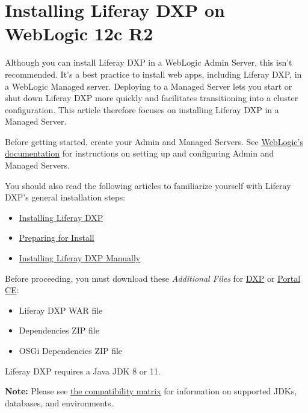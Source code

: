 \section{Installing Liferay DXP on WebLogic 12c
R2}\label{installing-liferay-dxp-on-weblogic-12c-r2}

Although you can install Liferay DXP in a WebLogic Admin Server, this
isn't recommended. It's a best practice to install web apps, including
Liferay DXP, in a WebLogic Managed server. Deploying to a Managed Server
lets you start or shut down Liferay DXP more quickly and facilitates
transitioning into a cluster configuration. This article therefore
focuses on installing Liferay DXP in a Managed Server.

Before getting started, create your Admin and Managed Servers. See
\href{http://www.oracle.com/technetwork/middleware/weblogic/documentation/index.html}{WebLogic's
documentation} for instructions on setting up and configuring Admin and
Managed Servers.

You should also read the following articles to familiarize yourself with
Liferay DXP's general installation steps:

\begin{itemize}
\tightlist
\item
  \href{/docs/7-1/deploy/-/knowledge_base/d/installing-liferay}{Installing
  Liferay DXP}
\item
  \href{/docs/7-1/deploy/-/knowledge_base/d/preparing-for-install}{Preparing
  for Install}
\item
  \href{/docs/7-1/deploy/-/knowledge_base/d/installing-liferay-manually}{Installing
  Liferay DXP Manually}
\end{itemize}

Before proceeding, you must download these \emph{Additional Files} for
\href{https://help.liferay.com/hc}{DXP} or
\href{https://www.liferay.com/downloads-community}{Portal CE}:

\begin{itemize}
\tightlist
\item
  Liferay DXP WAR file
\item
  Dependencies ZIP file
\item
  OSGi Dependencies ZIP file
\end{itemize}

Liferay DXP requires a Java JDK 8 or 11.

\noindent\hrulefill

\textbf{Note:} Please see
\href{https://www.liferay.com/documents/10182/246659966/Liferay+DXP+7.1+Compatibility+Matrix.pdf/c8805b72-c693-1f26-3f2d-731ffc301366}{the
compatibility matrix} for information on supported JDKs, databases, and
environments.

